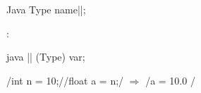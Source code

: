 \begin{sectionbox}\nospacing
  \begin{mintlinebox}{Java}
		Type name||;
  \end{mintlinebox}
  :
  \begin{mintlinebox}{java}
    || (Type) var;
  \end{mintlinebox}
\end{sectionbox}
\begin{notebox}\nospacing
  \javainline/int n = 10;/\hfil\javainline/float a = n;/ $\Rightarrow$ \javainline/a = 10.0 /
\end{notebox}
